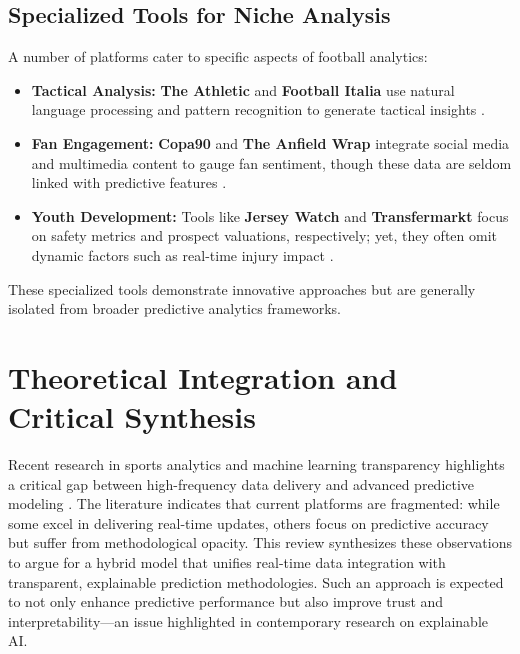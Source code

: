 \subsection{Specialized Tools for Niche Analysis}
A number of platforms cater to specific aspects of football analytics:
\begin{itemize}
    \item \textbf{Tactical Analysis:} \textbf{The Athletic} and \textbf{Football Italia} use natural language processing and pattern recognition to generate tactical insights \cite{athletic, footballitalia}.
    \item \textbf{Fan Engagement:} \textbf{Copa90} and \textbf{The Anfield Wrap} integrate social media and multimedia content to gauge fan sentiment, though these data are seldom linked with predictive features \cite{copa90, anfieldwrap}.
    \item \textbf{Youth Development:} Tools like \textbf{Jersey Watch} and \textbf{Transfermarkt} focus on safety metrics and prospect valuations, respectively; yet, they often omit dynamic factors such as real-time injury impact \cite{jerseywatch, transfermarkt}.
\end{itemize}
These specialized tools demonstrate innovative approaches but are generally isolated from broader predictive analytics frameworks.

\section{Theoretical Integration and Critical Synthesis}
Recent research in sports analytics and machine learning transparency highlights a critical gap between high-frequency data delivery and advanced predictive modeling \cite{sportsAnalytics, mlTransparency}. The literature indicates that current platforms are fragmented: while some excel in delivering real-time updates, others focus on predictive accuracy but suffer from methodological opacity. This review synthesizes these observations to argue for a hybrid model that unifies real-time data integration with transparent, explainable prediction methodologies. Such an approach is expected to not only enhance predictive performance but also improve trust and interpretability—an issue highlighted in contemporary research on explainable AI.

